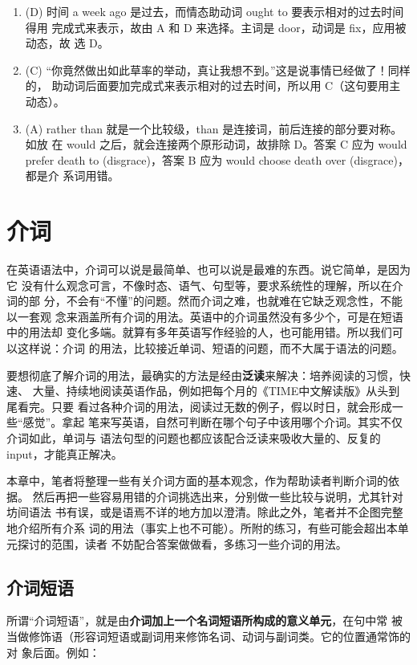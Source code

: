 \begin{enumerate}
\item (D) 时间 a week ago 是过去，而情态助动词 ought to 要表示相对的过去时间得用
  完成式来表示，故由 A 和 D 来选择。主词是 door，动词是 fix，应用被动态，故
  选 D。

\item (C) “你竟然做出如此草率的举动，真让我想不到。”这是说事情已经做了！同样的，
  助动词后面要加完成式来表示相对的过去时间，所以用 C（这句要用主动态）。
\item (A) rather than 就是一个比较级，than 是连接词，前后连接的部分要对称。如放
  在 would 之后，就会连接两个原形动词，故排除 D。答案 C 应为 would prefer
  death to (disgrace)，答案 B 应为 would choose death over (disgrace)，都是介
  系词用错。

\end{enumerate}

\chapter{介词}

在英语语法中，介词可以说是最简单、也可以说是最难的东西。说它简单，是因为它
没有什么观念可言，不像时态、语气、句型等，要求系统性的理解，所以在介词的部
分，不会有“不懂”的问题。然而介词之难，也就难在它缺乏观念性，不能以一套观
念来涵盖所有介词的用法。英语中的介词虽然没有多少个，可是在短语中的用法却
变化多端。就算有多年英语写作经验的人，也可能用错。所以我们可以这样说：介词
的用法，比较接近单词、短语的问题，而不大属于语法的问题。

要想彻底了解介词的用法，最确实的方法是经由\textbf{泛读}来解决：培养阅读的习惯，快速、
大量、持续地阅读英语作品，例如把每个月的《TIME中文解读版》从头到尾看完。只要
看过各种介词的用法，阅读过无数的例子，假以时日，就会形成一些“感觉”。拿起
笔来写英语，自然可判断在哪个句子中该用哪个介词。其实不仅介词如此，单词与
语法句型的问题也都应该配合泛读来吸收大量的、反复的input，才能真正解决。

本章中，笔者将整理一些有关介词方面的基本观念，作为帮助读者判断介词的依据。
然后再把一些容易用错的介词挑选出来，分别做一些比较与说明，尤其针对坊间语法
书有误，或是语焉不详的地方加以澄清。除此之外，笔者并不企图完整地介绍所有介系
词的用法（事实上也不可能）。所附的练习，有些可能会超出本单元探讨的范围，读者
不妨配合答案做做看，多练习一些介词的用法。

\section{介词短语}

所谓“介词短语”，就是由\textbf{介词加上一个名词短语所构成的意义单元}，在句中常
被当做修饰语（形容词短语或副词用来修饰名词、动词与副词类。它的位置通常饰的对
象后面。例如：

